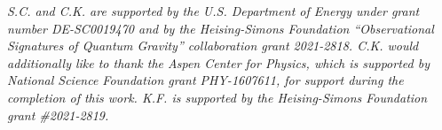 \textit{S.C. and C.K.  are supported by the U.S. Department of Energy under grant number DE-SC0019470 and by the
Heising-Simons Foundation ``Observational Signatures of Quantum Gravity'' collaboration grant 2021-2818. C.K. would
additionally like to thank the Aspen Center for Physics, which is supported by National Science Foundation grant
PHY-1607611, for support during the completion of this work. K.F. is supported by the Heising-Simons Foundation
grant \#2021-2819.  }

\nobibintoc
\printbibliography[heading=subbibliography]

